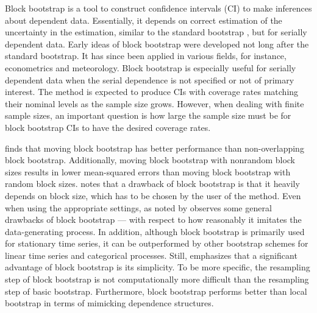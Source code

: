 \documentclass[10pt]{article}
\newcommand{\eds}[1]{\textcolor{red}{EDS: (#1)}}
\newcommand{\mc}[1]{\textcolor{orange}{MC: (#1)}}
\begin{document}
Block bootstrap is a tool to construct confidence intervals (CI) to make
inferences about dependent data. Essentially, it depends on correct estimation
of the uncertainty in the estimation, similar to the standard bootstrap 
\citep{efron1979bootstrap}, but for serially dependent data.
Early ideas of block bootstrap were developed not long after the standard 
bootstrap.\citep{hall1985resampling, carlstein1986use,kunsch1989jackknife} It 
has since
been applied in various fields, for instance, econometrics and 
meteorology.\citep{mackinnon2006bootstrap, varga2017generalised}
Block bootstrap is especially useful for serially dependent data when the serial 
dependence is not specified or not of primary interest. The method is expected 
to produce CIs with coverage rates matching their nominal levels as the sample 
size grows. However, when dealing with finite sample sizes, an important 
question is how large the sample size must be for block bootstrap CIs to have 
the desired coverage rates.

\citet{lahiri1999theoretical} finds that moving block bootstrap has better 
performance than non-overlapping block bootstrap. Additionally, moving block 
bootstrap with nonrandom
block sizes results in lower mean-squared errors than moving block bootstrap
with random block sizes. \citet{buhlmann1999block} notes that a drawback of 
block bootstrap is that it heavily depends on block size, which has to be chosen
by the user of the method.
Even when using the appropriate settings, as noted by
\citet{buhlmann2002bootstraps} observes some general drawbacks of block 
bootstrap --- with respect to how reasonably it imitates the data-generating 
process. In addition, although block bootstrap is primarily used for stationary 
time series, it can be outperformed by other bootstrap schemes for linear time
series and categorical processes. Still, \citet{buhlmann2002bootstraps}
emphasizes that a significant advantage of block bootstrap is its simplicity.
To be more specific, the resampling step of block bootstrap is not 
computationally more difficult than the resampling step of basic bootstrap.
Furthermore, block bootstrap performs better than local bootstrap in terms of
mimicking dependence structures.
\end{document}

